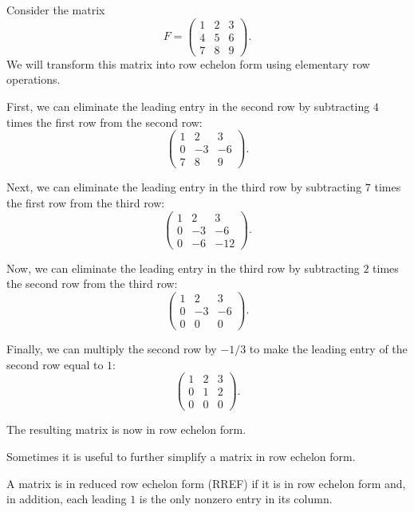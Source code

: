 \begin{example}\label{L1-ex:F}
    Consider the matrix
    \[F = \begin{pmatrix}
        1 & 2 & 3 \\
        4 & 5 & 6 \\
        7 & 8 & 9
    \end{pmatrix}.\]
    We will transform this matrix into row echelon form using elementary row operations.

    First, we can eliminate the leading entry in the second row by subtracting $4$ times the first row from the second row:
    \[\begin{pmatrix}
        1 & 2 & 3 \\
        0 & -3 & -6 \\
        7 & 8 & 9
    \end{pmatrix}.\]

    Next, we can eliminate the leading entry in the third row by subtracting $7$ times the first row from the third row:
    \[\begin{pmatrix}
        1 & 2 & 3 \\
        0 & -3 & -6 \\
        0 & -6 & -12
    \end{pmatrix}.\]

    Now, we can eliminate the leading entry in the third row by subtracting $2$ times the second row from the third row:
    \[\begin{pmatrix}
        1 & 2 & 3 \\
        0 & -3 & -6 \\
        0 & 0 & 0
    \end{pmatrix}.\]

    Finally, we can multiply the second row by $-1/3$ to make the leading entry of the second row equal to $1$:
    \[\begin{pmatrix}
        1 & 2 & 3 \\
        0 & 1 & 2 \\
        0 & 0 & 0
    \end{pmatrix}.\]

    The resulting matrix is now in row echelon form.
\end{example}

Sometimes it is useful to further simplify a matrix in row echelon form.

\begin{definition}
    A matrix is in reduced row echelon form (RREF) if it is in row echelon form and, in addition, each leading $1$ is the only nonzero entry in its column.
\end{definition}

